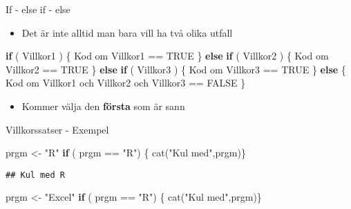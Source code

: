 \documentclass[
  11pt,
  ignorenonframetext,
]{beamer}
\newenvironment{Shaded}{\begin{snugshade}}{\end{snugshade}}
\newcommand{\ConstantTok}[1]{\textcolor[rgb]{0.00,0.00,0.00}{#1}}
\newcommand{\ControlFlowTok}[1]{\textcolor[rgb]{0.13,0.29,0.53}{\textbf{#1}}}
\newcommand{\FunctionTok}[1]{\textcolor[rgb]{0.00,0.00,0.00}{#1}}
\newcommand{\NormalTok}[1]{#1}
\newcommand{\OtherTok}[1]{\textcolor[rgb]{0.56,0.35,0.01}{#1}}
\newcommand{\SpecialCharTok}[1]{\textcolor[rgb]{0.00,0.00,0.00}{#1}}
\newcommand{\StringTok}[1]{\textcolor[rgb]{0.31,0.60,0.02}{#1}}
\providecommand{\tightlist}{%
  \setlength{\itemsep}{0pt}\setlength{\parskip}{0pt}}
\newcommand\imp[1]{\alert{\textbf{#1}}}
\begin{document}
\begin{frame}[fragile]{If - else if - else}
\protect\hypertarget{if---else-if---else}{}
\begin{itemize}
\tightlist
\item
  Det är inte alltid man bara vill ha två olika utfall
\end{itemize}

\begin{Shaded}
\begin{Highlighting}[]
\ControlFlowTok{if}\NormalTok{ ( Villkor1 ) \{}
\NormalTok{  Kod om Villkor1 }\SpecialCharTok{==} \ConstantTok{TRUE}
\NormalTok{\} }\ControlFlowTok{else} \ControlFlowTok{if}\NormalTok{ ( Villkor2 ) \{}
\NormalTok{  Kod om Villkor2 }\SpecialCharTok{==} \ConstantTok{TRUE}
\NormalTok{\} }\ControlFlowTok{else} \ControlFlowTok{if}\NormalTok{ ( Villkor3 ) \{}
\NormalTok{  Kod om Villkor3 }\SpecialCharTok{==} \ConstantTok{TRUE}
\NormalTok{\} }\ControlFlowTok{else}\NormalTok{ \{}
\NormalTok{  Kod om Villkor1 och Villkor2 och Villkor3 }\SpecialCharTok{==} \ConstantTok{FALSE}
\NormalTok{\}}
\end{Highlighting}
\end{Shaded}

\begin{itemize}
\tightlist
\item
  Kommer välja den \imp{första} som är sann
\end{itemize}
\end{frame}


\begin{frame}[fragile]{Villkorssatser - Exempel}
\protect\hypertarget{villkorssatser---exempel}{}
\begin{Shaded}
\begin{Highlighting}[]
\NormalTok{prgm }\OtherTok{\textless{}{-}} \StringTok{"R"}
\ControlFlowTok{if}\NormalTok{ ( prgm }\SpecialCharTok{==} \StringTok{"R"}\NormalTok{) \{ }\FunctionTok{cat}\NormalTok{(}\StringTok{"Kul med"}\NormalTok{,prgm)\}}
\end{Highlighting}
\end{Shaded}

\pause

\begin{verbatim}
## Kul med R
\end{verbatim}

\pause

\begin{Shaded}
\begin{Highlighting}[]
\NormalTok{prgm }\OtherTok{\textless{}{-}} \StringTok{"Excel"}
\ControlFlowTok{if}\NormalTok{ ( prgm }\SpecialCharTok{==} \StringTok{"R"}\NormalTok{) \{ }\FunctionTok{cat}\NormalTok{(}\StringTok{"Kul med"}\NormalTok{,prgm)\}}
\end{Highlighting}
\end{Shaded}
\end{frame}
\end{document}

